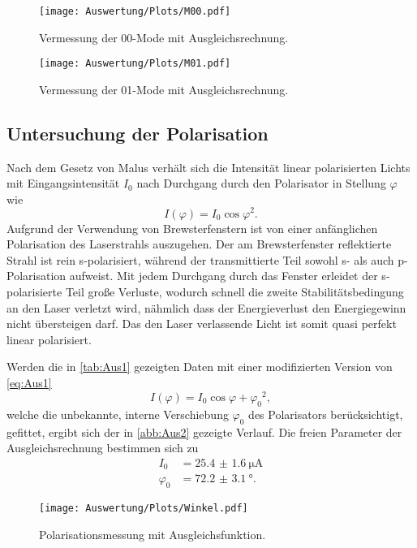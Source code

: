 \begin{figure}[h]
  \centering
  \texttt{[image: Auswertung/Plots/M00.pdf]}
  \caption{Vermessung der 00-Mode mit Ausgleichsrechnung.}
  \label{abb:Aus3}
\end{figure}

\begin{figure}[h]
  \centering
  \texttt{[image: Auswertung/Plots/M01.pdf]}
  \caption{Vermessung der 01-Mode mit Ausgleichsrechnung.}
  \label{abb:Aus4}
\end{figure}


\subsection{Untersuchung der Polarisation}
Nach dem Gesetz von Malus verhält sich die Intensität linear polarisierten Lichts
mit Eingangsintensität $I_{0}$ nach Durchgang durch den Polarisator in Stellung $\varphi$ wie
\begin{equation}
  I(\varphi) = I_{0} \cos{\varphi}^{2}.
  \label{eq:Aus1}
\end{equation}
Aufgrund der Verwendung von Brewsterfenstern ist von einer anfänglichen Polarisation
des Laserstrahls auszugehen.
Der am Brewsterfenster reflektierte Strahl ist rein s-polarisiert, während der
transmittierte Teil sowohl s- als auch p-Polarisation aufweist. Mit jedem Durchgang
durch das Fenster erleidet der s-polarisierte Teil große Verluste, wodurch schnell
die zweite Stabilitätsbedingung an den Laser verletzt wird, nähmlich dass der
Energieverlust den Energiegewinn nicht übersteigen darf.
Das den Laser verlassende Licht ist somit quasi perfekt linear polarisiert.

Werden die in \autoref{tab:Aus1} gezeigten Daten mit einer modifizierten Version
von \eqref{eq:Aus1}
\begin{equation*}
  I(\varphi) = I_{0} \cos{\varphi + \varphi_{0}}^{2},
\end{equation*}
welche die unbekannte, interne Verschiebung $\varphi_{0}$ des Polarisators berücksichtigt,
gefittet, ergibt sich der in \autoref{abb:Aus2} gezeigte Verlauf.
Die freien Parameter der Ausgleichsrechnung bestimmen sich zu
\begin{align*}
  I_{0} &= \SI{25.4(16)}{\uA} \\
  \varphi_{0} &= \SI{72.2(31)}{\degree}.
\end{align*}

\begin{figure}[h]
  \centering
  \texttt{[image: Auswertung/Plots/Winkel.pdf]}
  \caption{Polarisationsmessung mit Ausgleichsfunktion.}
  \label{abb:Aus2}
\end{figure}

